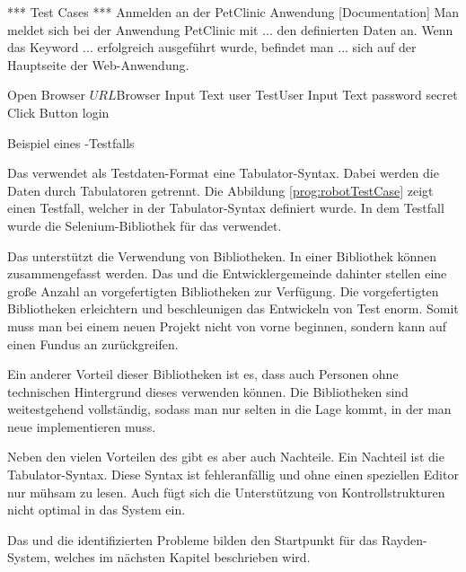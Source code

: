 \begin{program}
\begin{JavaCode}
*** Test Cases ***
Anmelden an der PetClinic Anwendung
	[Documentation]	Man meldet sich bei der Anwendung PetClinic mit 
	...             den definierten Daten an. Wenn das Keyword 
	...             erfolgreich ausgeführt wurde, befindet man 
	...             sich auf der Hauptseite der Web-Anwendung.
	
	Open Browser	${URL}		${Browser}
	Input Text    user			TestUser
	Input Text		password	secret
	Click Button	login

\end{JavaCode}
\caption{Beispiel eines -Testfalls}
\label{prog:robotTestCase}
\end{program}

\SuperPar
Das  verwendet als Testdaten-Format eine Tabulator-Syntax. Dabei werden die Daten durch Tabulatoren getrennt. Die Abbildung \ref{prog:robotTestCase} zeigt einen Testfall, welcher in der Tabulator-Syntax definiert wurde. In dem Testfall wurde die Selenium-Bibliothek für das  verwendet. 

\SuperPar
Das  unterstützt die Verwendung von Bibliotheken. In einer Bibliothek können  zusammengefasst werden. Das  und die Entwicklergemeinde dahinter stellen eine große Anzahl an vorgefertigten Bibliotheken zur Verfügung. Die vorgefertigten Bibliotheken erleichtern und beschleunigen das Entwickeln von Test enorm. Somit muss man bei einem neuen Projekt nicht von vorne beginnen, sondern kann auf einen Fundus an  zurückgreifen.

\SuperPar
Ein anderer Vorteil dieser Bibliotheken ist es, dass auch Personen ohne technischen Hintergrund dieses  verwenden können. Die Bibliotheken sind weitestgehend vollständig, sodass man nur selten in die Lage kommt, in der man neue  implementieren muss.

\SuperPar
Neben den vielen Vorteilen des  gibt es aber auch Nachteile. Ein Nachteil ist die Tabulator-Syntax. Diese Syntax ist fehleranfällig und ohne einen speziellen Editor nur mühsam zu lesen. Auch fügt sich die Unterstützung von Kontrollstrukturen nicht optimal in das System ein.

\SuperPar
Das  und die identifizierten Probleme bilden den Startpunkt für das Rayden-System, welches im nächsten Kapitel beschrieben wird.

